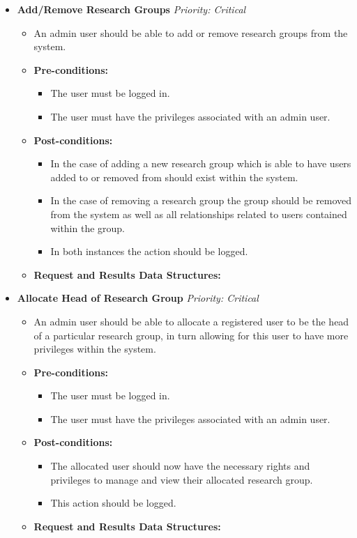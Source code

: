 \documentclass{article}
\begin{document}
				\begin{itemize}
					\item \textbf{Add/Remove Research Groups} \hfill \textit{Priority: Critical}
					\begin{itemize}
						\item An admin user should be able to add or remove research groups from the system.
						\item \textbf{Pre-conditions:}
						\begin{itemize}
							\item The user must be logged in.
							\item The user must have the privileges associated with an admin user.
						\end{itemize}
						\item \textbf{Post-conditions:}
						\begin{itemize}
							\item In the case of adding a new research group which is able to have users added to or removed from should exist within the system.
							\item In the case of removing a research group the group should be removed from the system as well as all relationships related to users contained within the group.
							\item In both instances the action should be logged.
						\end{itemize}
						\item \textbf{Request and Results Data Structures:}
					\end{itemize}

					\item \textbf{Allocate Head of Research Group} \hfill \textit{Priority: Critical}
					\begin{itemize}
						\item An admin user should be able to allocate a registered user to be the head of a particular research group, in turn allowing for this user to have more privileges within the system.
						\item \textbf{Pre-conditions:}
						\begin{itemize}
							\item The user must be logged in.
							\item The user must have the privileges associated with an admin user.
						\end{itemize}
						\item \textbf{Post-conditions:}
						\begin{itemize}
							\item The allocated user should now have the necessary rights and privileges to manage and view their allocated research group.
							\item This action should be logged.
						\end{itemize}
						\item \textbf{Request and Results Data Structures:}
					\end{itemize}
				\end{itemize}
			
\end{document}
